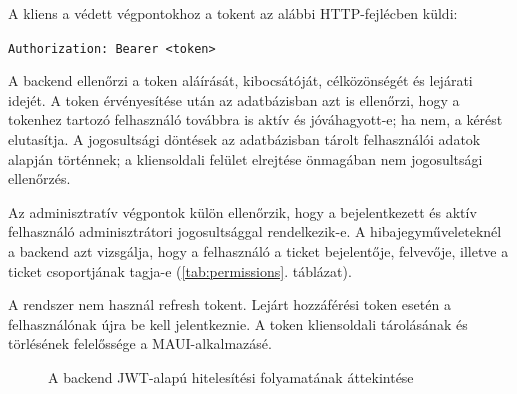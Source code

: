 \documentclass[12pt, a4paper, twoside]{article}
\begin{document}
A kliens a védett végpontokhoz a tokent az alábbi HTTP-fejlécben küldi:

\begin{center}
\texttt{Authorization: Bearer <token>}
\end{center}

A backend ellenőrzi a token aláírását, kibocsátóját, célközönségét és lejárati idejét. A token érvényesítése után az adatbázisban azt is ellenőrzi, hogy a tokenhez tartozó felhasználó továbbra is aktív és jóváhagyott-e; ha nem, a kérést elutasítja. A jogosultsági döntések az adatbázisban tárolt felhasználói adatok alapján történnek; a kliensoldali felület elrejtése önmagában nem jogosultsági ellenőrzés.

Az adminisztratív végpontok külön ellenőrzik, hogy a bejelentkezett és aktív felhasználó adminisztrátori jogosultsággal rendelkezik-e. A hibajegyműveleteknél a backend azt vizsgálja, hogy a felhasználó a ticket bejelentője, felvevője, illetve a ticket csoportjának tagja-e (\ref{tab:permissions}. táblázat).

A rendszer nem használ refresh tokent. Lejárt hozzáférési token esetén a felhasználónak újra be kell jelentkeznie. A token kliensoldali tárolásának és törlésének felelőssége a MAUI-alkalmazásé.

\begin{figure}[htbp]
    \centering
    \caption{A backend JWT-alapú hitelesítési folyamatának áttekintése}
    \label{fig:auth-flow}
\end{figure}
\end{document}
